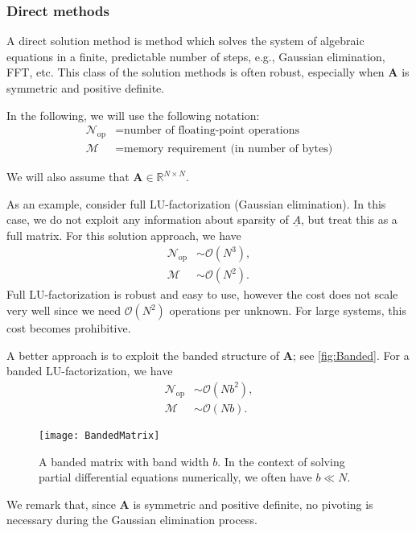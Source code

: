 \subsubsection{Direct methods}

A direct solution method is method which solves the system of algebraic
equations in a finite, predictable number of steps, e.g., Gaussian elimination,
FFT, etc. This class of the solution methods is often robust, especially when
$\bm A$ is symmetric and positive definite.

In the following, we will use the following notation:
\begin{align*}
  \mathcal{N}_\text{op} &= \text{number of floating-point operations} \\
  \mathcal{M} &= \text{memory requirement (in number of bytes)}
\end{align*}

We will also assume that $\bm A \in \mathbb{R}^{N \times N}$.

As an example, consider full LU-factorization (Gaussian elimination). In this
case, we do not exploit any information about sparsity of $\underline{A}$, but
treat this as a full matrix. For this solution approach, we have
\begin{align*}
  \mathcal{N}_\text{op} &\sim \mathcal{O}(N^3), \\
  \mathcal{M} &\sim \mathcal{O}(N^2).
\end{align*}
Full LU-factorization is robust and easy to use, however the cost does not scale
very well since we need $\mathcal{O}(N^2)$ operations per unknown. For large
systems, this cost becomes prohibitive.

A better approach is to exploit the banded structure of $\bm A$; see
\autoref{fig:Banded}. For a banded LU-factorization, we have
\begin{align*}
  \mathcal{N}_\text{op} &\sim \mathcal{O}(N b^2) ,\\
  \mathcal{M} &\sim \mathcal{O}(N b) .
\end{align*}

\begin{figure}
  \centering
  \texttt{[image: BandedMatrix]}
  \caption{
    A banded matrix with band width $b$. In the context of solving partial
    differential equations numerically, we often have $b \ll N$.
  }
  \label{fig:Banded}
\end{figure}

We remark that, since $\bm A$ is symmetric and positive definite, no pivoting is
necessary during the Gaussian elimination process.

